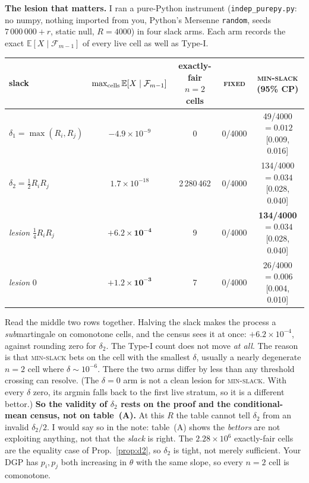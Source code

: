 \documentclass[11pt]{article}
\newcommand{\E}{\mathbb{E}}
\newcommand{\Fc}{\mathcal{F}}
\begin{document}
\textbf{The lesion that matters.} I ran a pure-Python instrument (\texttt{indep\_purepy.py}: no numpy, nothing imported from you, Python's Mersenne \texttt{random}, seeds $7\,000\,000+r$, static null, $R=4000$) in four slack arms. Each arm records the exact $\E[X\mid\Fc_{m-1}]$ of every live cell as well as Type-I.
\begin{center}\small
\begin{tabular}{lcccc}
\toprule
slack & $\max_{\rm cells}\E[X\mid\Fc_{m-1}]$ & exactly-fair $n=2$ cells & \textsc{fixed} & \textsc{min-slack} (95\% CP)\\
\midrule
$\delta_1=\max(R_i,R_j)$ & $-4.9\times10^{-9}$ & 0 & 0/4000 & 49/4000 $=0.012$ [0.009, 0.016]\\
$\delta_2=\frac12R_iR_j$ & $1.7\times10^{-18}$ & 2\,280\,462 & 0/4000 & 134/4000 $=0.034$ [0.028, 0.040]\\
\emph{lesion} $\frac14R_iR_j$ & $\mathbf{+6.2\times10^{-4}}$ & 9 & 0/4000 & \textbf{134/4000} $=0.034$ [0.028, 0.040]\\
\emph{lesion} $0$ & $\mathbf{+1.2\times10^{-3}}$ & 7 & 0/4000 & 26/4000 $=0.006$ [0.004, 0.010]\\
\bottomrule
\end{tabular}
\end{center}
Read the middle two rows together. Halving the slack makes the process a \emph{sub}martingale on comonotone cells, and the census sees it at once: $+6.2\times10^{-4}$, against rounding zero for $\delta_2$. The Type-I count does not move \emph{at all}.
The reason is that \textsc{min-slack} bets on the cell with the smallest $\delta$, usually a nearly degenerate $n=2$ cell where $\delta\sim10^{-6}$. There the two arms differ by less than any threshold crossing can resolve.
(The $\delta=0$ arm is not a clean lesion for \textsc{min-slack}. With every $\delta$ zero, its argmin falls back to the first live stratum, so it is a different bettor.)
\textbf{So the validity of $\delta_2$ rests on the proof and the conditional-mean census, not on table~(A).} At this $R$ the table cannot tell $\delta_2$ from an invalid $\delta_2/2$. I would say so in the note: table~(A) shows the \emph{bettors} are not exploiting anything, not that the \emph{slack} is right.
The $2.28\times10^6$ exactly-fair cells are the equality case of Prop.~\ref{prop:d2}, so $\delta_2$ is tight, not merely sufficient. Your DGP has $p_i,p_j$ both increasing in $\theta$ with the same slope, so every $n=2$ cell is comonotone.
\end{document}
